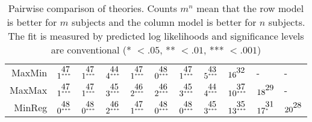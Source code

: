 \documentclass[a4paper]{article}\usepackage[]{graphicx}\usepackage[]{color}
\renewcommand{\tabcolsep}{3pt}
\renewenvironment{table*}[1][1]{
  \begin{table}[#1]\footnotesize
    \begin{adjustwidth}{-1cm}{}
    }{
    \end{adjustwidth}
  \end{table}}
\begin{document}
\begin{table*}[!htb]
\begin{tabular}{rllllllllll}
  MaxMin & $1^{\stackrel{\textstyle47\hfill}{\scriptscriptstyle***\hfill}}$ & $1^{\stackrel{\textstyle47\hfill}{\scriptscriptstyle***\hfill}}$ & $4^{\stackrel{\textstyle44\hfill}{\scriptscriptstyle***\hfill}}$ & $1^{\stackrel{\textstyle47\hfill}{\scriptscriptstyle***\hfill}}$ & $0^{\stackrel{\textstyle48\hfill}{\scriptscriptstyle***\hfill}}$ & $1^{\stackrel{\textstyle47\hfill}{\scriptscriptstyle***\hfill}}$ & $5^{\stackrel{\textstyle43\hfill}{\scriptscriptstyle***\hfill}}$ & $16^{\stackrel{\textstyle32\hfill}{\scriptscriptstyle\hfill}}$ & - & - \\ 
  MaxMax & $1^{\stackrel{\textstyle47\hfill}{\scriptscriptstyle***\hfill}}$ & $1^{\stackrel{\textstyle47\hfill}{\scriptscriptstyle***\hfill}}$ & $3^{\stackrel{\textstyle45\hfill}{\scriptscriptstyle***\hfill}}$ & $2^{\stackrel{\textstyle46\hfill}{\scriptscriptstyle***\hfill}}$ & $2^{\stackrel{\textstyle46\hfill}{\scriptscriptstyle***\hfill}}$ & $3^{\stackrel{\textstyle45\hfill}{\scriptscriptstyle***\hfill}}$ & $4^{\stackrel{\textstyle44\hfill}{\scriptscriptstyle***\hfill}}$ & $10^{\stackrel{\textstyle37\hfill}{\scriptscriptstyle***\hfill}}$ & $18^{\stackrel{\textstyle29\hfill}{\scriptscriptstyle\hfill}}$ & - \\ 
  MinReg & $0^{\stackrel{\textstyle48\hfill}{\scriptscriptstyle***\hfill}}$ & $0^{\stackrel{\textstyle48\hfill}{\scriptscriptstyle***\hfill}}$ & $2^{\stackrel{\textstyle46\hfill}{\scriptscriptstyle***\hfill}}$ & $1^{\stackrel{\textstyle47\hfill}{\scriptscriptstyle***\hfill}}$ & $0^{\stackrel{\textstyle48\hfill}{\scriptscriptstyle***\hfill}}$ & $0^{\stackrel{\textstyle48\hfill}{\scriptscriptstyle***\hfill}}$ & $3^{\stackrel{\textstyle45\hfill}{\scriptscriptstyle***\hfill}}$ & $13^{\stackrel{\textstyle35\hfill}{\scriptscriptstyle***\hfill}}$ & $17^{\stackrel{\textstyle31\hfill}{\scriptscriptstyle*\hfill}}$ & $20^{\stackrel{\textstyle28\hfill}{\scriptscriptstyle\hfill}}$ \\ 
   \hline
\end{tabular}
\caption{Pairwise comparison of theories. Counts $m^{\textstyle n}$ mean that the row model is better for $m$ subjects and the column model is better for $n$ subjects. The fit is measured by predicted log likelihoods and significance levels are conventional (* $< .05$, ** $< .01$, *** $< .001$)} 
\label{table3_sig_counts_all_models}
\end{table*}
\end{document}
